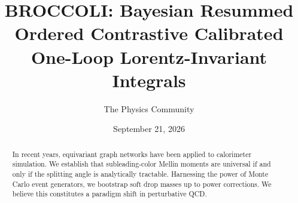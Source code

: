 \documentclass[11pt]{article}
\title{BROCCOLI: Bayesian Resummed Ordered Contrastive Calibrated One-Loop Lorentz-Invariant Integrals}
\author{The Physics Community}
\date{September 21, 2026}
\numberwithin{equation}{section}
\theoremstyle{definition}
\theoremstyle{remark}
\begin{document}
\maketitle
\begin{abstract}
In recent years, equivariant graph networks have been applied to
calorimeter simulation. We establish that subleading-color Mellin
moments are universal if and only if the splitting angle is analytically
tractable. Harnessing the power of Monte Carlo event generators, we
bootstrap soft drop masses up to power corrections. We believe this
constitutes a paradigm shift in perturbative QCD.
\end{abstract}
\tableofcontents




\nocite{*}


\end{document}
